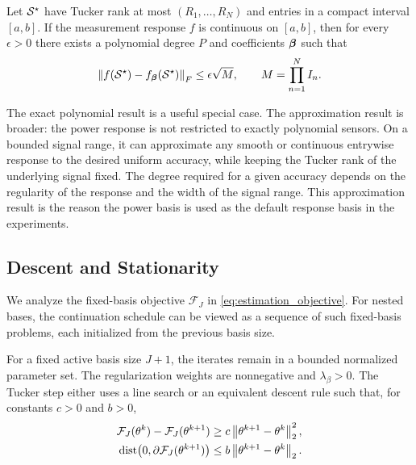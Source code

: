 \begin{theorem}
\label{thm:response_approximation}
Let $\mathcal{S}^\star$ have Tucker rank at most $(R_1,\ldots,R_N)$ and entries in a
compact interval $[a,b]$. If the measurement response $f$ is continuous on
$[a,b]$, then for every $\epsilon>0$ there exists a polynomial degree $P$ and
coefficients $\boldsymbol{\beta}$ such that
\begin{equation}
  \left\lVert f(\mathcal{S}^\star)-f_{\boldsymbol{\beta}}(\mathcal{S}^\star) \right\rVert_F
  \le
  \epsilon \sqrt{M},
  \qquad
  M=\prod_{n=1}^{N}I_n .
\end{equation}
\end{theorem}

The exact polynomial result is a useful special case. The approximation result
is broader: the power response is not restricted to exactly polynomial sensors.
On a bounded signal range, it can approximate any smooth or continuous
entrywise response to the desired uniform accuracy, while keeping the Tucker
rank of the underlying signal fixed. The degree required for a given accuracy
depends on the regularity of the response and the width of the signal range.
This approximation result is the reason the power basis is used as the
default response basis in the experiments.

\subsection{Descent and Stationarity}

We analyze the fixed-basis objective $\mathcal{F}_J$ in
\eqref{eq:estimation_objective}. For nested bases, the continuation schedule
can be viewed as a sequence of such fixed-basis problems, each initialized from
the previous basis size.

\begin{assumption}
\label{ass:optimization}
For a fixed active basis size $J+1$, the iterates remain in a bounded normalized
parameter set. The regularization weights are nonnegative and
$\lambda_\beta>0$. The Tucker step either uses a line search or an equivalent
descent rule such that, for constants $c>0$ and $b>0$,
\begin{align}
  \mathcal{F}_J(\theta^k)-\mathcal{F}_J(\theta^{k+1})
  &\ge c\left\lVert \theta^{k+1}-\theta^k \right\rVert_2^2,
  \label{eq:sufficient_decrease}\\
  \mathrm{dist}\!\left(0,\partial \mathcal{F}_J(\theta^{k+1})\right)
  &\le b\left\lVert \theta^{k+1}-\theta^k \right\rVert_2 .
  \label{eq:relative_error}
\end{align}
\end{assumption}

